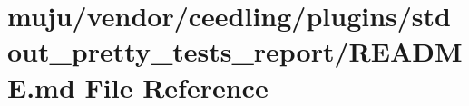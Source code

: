 \hypertarget{vendor_2ceedling_2plugins_2stdout__pretty__tests__report_2_r_e_a_d_m_e_8md}{}\section{muju/vendor/ceedling/plugins/stdout\+\_\+pretty\+\_\+tests\+\_\+report/\+R\+E\+A\+D\+ME.md File Reference}
\label{vendor_2ceedling_2plugins_2stdout__pretty__tests__report_2_r_e_a_d_m_e_8md}
